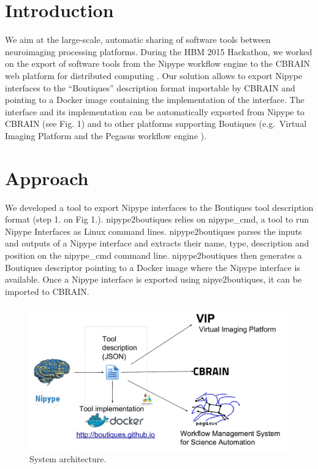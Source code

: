\documentclass[twocolumn]{bmcart}%
\begin{document}

\section{Introduction}\label{introduction}

We aim at the large-scale, automatic sharing of software tools between
neuroimaging processing platforms. During the HBM 2015 Hackathon, we
worked on the export of software tools from the Nipype workflow engine
\cite{Gorgolewski2011} to the CBRAIN web platform for distributed
computing \cite{sherif2014cbrain}. Our solution allows to export Nipype
interfaces to the ``Boutiques'' description format importable by CBRAIN
and pointing to a Docker image containing the implementation of the
interface. The interface and its implementation can be automatically
exported from Nipype to CBRAIN (see Fig. 1) and to other platforms
supporting Boutiques (e.g.~Virtual Imaging Platform \cite{GLAT-13} and
the Pegasus workflow engine \cite{DEEL-16}).

\section{Approach}\label{approach}

We developed a tool to export Nipype interfaces to the Boutiques tool
description format (step 1. on Fig 1.). nipype2boutiques relies on
nipype\_cmd, a tool to run Nipype Interfaces as Linux command lines.
nipype2boutiques parses the inputs and outputs of a Nipype interface and
extracts their name, type, description and position on the nipype\_cmd
command line. nipype2boutiques then generates a Boutiques descriptor
pointing to a Docker image where the Nipype interface is available. Once
a Nipype interface is exported using nipye2boutiques, it can be imported
to CBRAIN.

\begin{figure}[h!]
  \includegraphics[width=.47\textwidth]{architecture.pdf}
  \caption{\label{centfig} System architecture.}
\end{figure}
\end{document}
